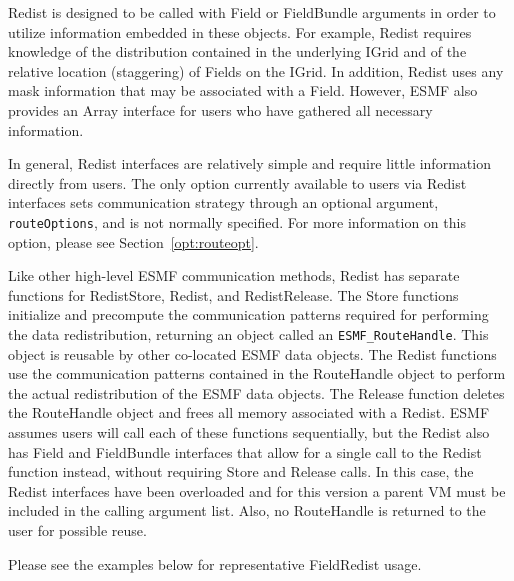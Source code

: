 Redist is designed to be called with Field or FieldBundle arguments in order to
utilize information embedded in these objects.  For example, Redist requires
knowledge of the distribution contained in the underlying IGrid and of the
relative location (staggering) of Fields on the IGrid.  In addition, Redist uses
any mask information that may be associated with a Field.  However, ESMF also
provides an Array interface for users who have gathered all necessary
information.

In general, Redist interfaces are relatively simple and require little
information directly from users.  The only option currently available to users
via Redist interfaces sets communication strategy through an optional argument,
{\tt routeOptions}, and is not normally specified.  For more information on
this option, please see Section~\ref{opt:routeopt}.

Like other high-level ESMF communication methods, Redist has separate
functions for RedistStore, Redist, and RedistRelease.  The Store functions
initialize and precompute the communication patterns required for performing
the data redistribution, returning an object called an {\tt ESMF\_RouteHandle}.
This object is reusable by other co-located ESMF data objects.
The Redist functions use the communication patterns contained in the RouteHandle
object to perform the actual redistribution of the ESMF data objects.  The
Release function deletes the RouteHandle object and frees all memory associated
with a Redist.  ESMF assumes users will call each of these functions
sequentially, but the Redist also has Field and FieldBundle interfaces that allow for
a single call to the Redist function instead, without requiring Store and
Release calls.  In this case, the Redist interfaces have been overloaded and
for this version a parent VM must be included in the calling argument list.
Also, no RouteHandle is returned to the user for possible reuse.

Please see the examples below for representative FieldRedist usage.



